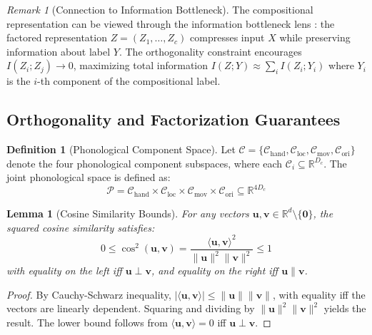\documentclass{article}
\newtheorem{lemma}[theorem]{Lemma}
\theoremstyle{definition}
\newtheorem{definition}[theorem]{Definition}
\theoremstyle{remark}
\newtheorem{remark}[theorem]{Remark}
\begin{document}
\begin{remark}[Connection to Information Bottleneck]
The compositional representation can be viewed through the information bottleneck lens \citep{tishby2000information}: the factored representation $Z = (Z_1, \ldots, Z_c)$ compresses input $X$ while preserving information about label $Y$. The orthogonality constraint encourages $I(Z_i; Z_j) \to 0$, maximizing total information $I(Z; Y) \approx \sum_i I(Z_i; Y_i)$ where $Y_i$ is the $i$-th component of the compositional label.
\end{remark}

\subsection{Orthogonality and Factorization Guarantees}

\begin{definition}[Phonological Component Space]
\label{def:component_space}
Let $\mathcal{C} = \{\mathcal{C}_{\text{hand}}, \mathcal{C}_{\text{loc}}, \mathcal{C}_{\text{mov}}, \mathcal{C}_{\text{ori}}\}$ denote the four phonological component subspaces, where each $\mathcal{C}_i \subseteq \mathbb{R}^{D_c}$. The joint phonological space is defined as:
\begin{equation}
\mathcal{P} = \mathcal{C}_{\text{hand}} \times \mathcal{C}_{\text{loc}} \times \mathcal{C}_{\text{mov}} \times \mathcal{C}_{\text{ori}} \subseteq \mathbb{R}^{4D_c}
\end{equation}
\end{definition}

\begin{lemma}[Cosine Similarity Bounds]
\label{lemma:cosine_bounds}
For any vectors $\mathbf{u}, \mathbf{v} \in \mathbb{R}^d \setminus \{\mathbf{0}\}$, the squared cosine similarity satisfies:
\begin{equation}
0 \leq \cos^2(\mathbf{u}, \mathbf{v}) = \frac{\langle \mathbf{u}, \mathbf{v} \rangle^2}{\|\mathbf{u}\|^2 \|\mathbf{v}\|^2} \leq 1
\end{equation}
with equality on the left iff $\mathbf{u} \perp \mathbf{v}$, and equality on the right iff $\mathbf{u} \parallel \mathbf{v}$.
\end{lemma}

\begin{proof}
By Cauchy-Schwarz inequality, $|\langle \mathbf{u}, \mathbf{v} \rangle| \leq \|\mathbf{u}\| \|\mathbf{v}\|$, with equality iff the vectors are linearly dependent. Squaring and dividing by $\|\mathbf{u}\|^2 \|\mathbf{v}\|^2$ yields the result. The lower bound follows from $\langle \mathbf{u}, \mathbf{v} \rangle = 0$ iff $\mathbf{u} \perp \mathbf{v}$.
\end{proof}
\end{document}
